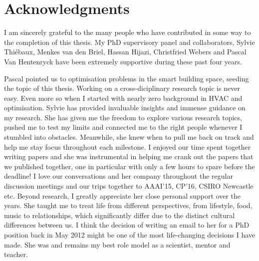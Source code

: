 \chapter*{Acknowledgments}


		
%

I am sincerely grateful to the many people who have contributed in some way to the completion of this thesis.
My PhD supervisory panel and collaborators, Sylvie Thi{\'e}baux, Menkes van den Briel, Hassan Hijazi, Christfried Webers and Pascal Van Hentenryck have been extremely supportive during these past four years. 

Pascal pointed us to optimisation problems in the smart building space, seeding the topic of this thesis.
Working on a cross-diciplinary research topic is never easy. Even more so when I started with nearly zero background in HVAC and optimisation. 
Sylvie has provided invaluable insights and immense guidance on my research. 
She has given me the freedom to explore various research topics, pushed me to test my limits and connected me to the right people whenever I stumbled into obstacles. 
Meanwhile, she knew when to pull me back on track and help me stay focus throughout each milestone. 
I enjoyed our time spent together writing papers and she was instrumental in helping me crank out the papers that we published together, one in particular with only a few hours to spare before the deadline!
I love our conversations and her company throughout the regular discussion meetings and our trips together to AAAI'15, CP'16, CSIRO Newcastle etc.
Beyond research, I greatly appreciate her close personal support over the years. She taught me to treat life from different perspectives, from lifestyle, food, music to relationships, which significantly differ due to the distinct cultural differences between us. 
I think the decision of writing an email to her for a PhD position back in May 2012 might be one of the most life-changing decisions I have made.
She was and remains my best role model as a scientist, mentor and teacher.

